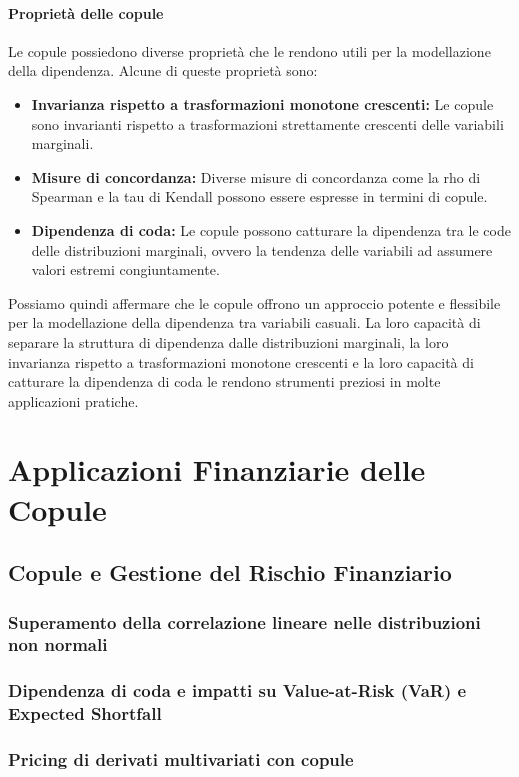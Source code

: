 \documentclass[%
	corpo=11pt,
    twoside,
    stile=classica,
    oldstyle,
    tipotesi=custom,
    greek,
    evenboxes,
]{toptesi}
\begin{document}
\subsection{Proprietà delle copule}
Le copule possiedono diverse proprietà che le rendono utili per la modellazione della dipendenza. Alcune di queste proprietà sono:

\begin{itemize}
	\item \textbf{Invarianza rispetto a trasformazioni monotone crescenti:}  
	Le copule sono invarianti rispetto a trasformazioni strettamente crescenti delle variabili marginali.
	
	\item \textbf{Misure di concordanza:}  
	Diverse misure di concordanza come la rho di Spearman e la tau di Kendall possono essere espresse in termini di copule.
	
	\item \textbf{Dipendenza di coda:}  
	Le copule possono catturare la dipendenza tra le code delle distribuzioni marginali, ovvero la tendenza delle variabili ad assumere valori estremi congiuntamente.
\end{itemize}

Possiamo quindi affermare che le copule offrono un approccio potente e flessibile per la modellazione della dipendenza tra variabili casuali. La loro capacità di separare la struttura di dipendenza dalle distribuzioni marginali, la loro invarianza rispetto a trasformazioni monotone crescenti e la loro capacità di catturare la dipendenza di coda le rendono strumenti preziosi in molte applicazioni pratiche.




\part{Applicazioni Finanziarie delle Copule}

\chapter{Copule e Gestione del Rischio Finanziario}

\section{Superamento della correlazione lineare nelle distribuzioni non normali}
\section{Dipendenza di coda e impatti su Value-at-Risk (VaR) e Expected Shortfall}
\section{Pricing di derivati multivariati con copule}



\end{document}
